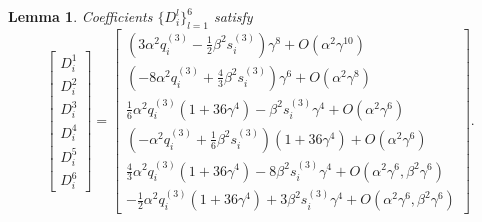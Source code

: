 \documentclass[11pt,letterpaper]{amsart}
\newtheorem{lemma}[theorem]{Lemma}
\theoremstyle{definition}
\theoremstyle{remark}
\numberwithin{equation}{section}
\begin{document}
\begin{lemma}\label{corfficient-h}
    Coefficients $\{D^l_i\}_{l=1}^6$ satisfy
    \begin{equation*}
    \begin{bmatrix}
        D^1_i\\
        D^2_i\\
        D^3_i\\
        D^4_i\\
        D^5_i\\
        D^6_i
    \end{bmatrix}=\begin{bmatrix}
        \left(3\alpha^2q^{(3)}_i-\frac{1}{2}\beta^2 s^{(3)}_i\right)\gamma^8+O(\alpha^2\gamma^{10})\\
       \left(-8\alpha^2q^{(3)}_i+\frac{4}{3}\beta^2 s^{(3)}_i\right)\gamma^6+O(\alpha^2\gamma^{8})\\
        \frac{1}{6}\alpha^2 q^{(3)}_i\left(1+36\gamma^4\right)-\beta^2 s^{(3)}_i\gamma^4+O(\alpha^2\gamma^6 )\\
        \left(-\alpha^2 q^{(3)}_i+\frac{1}{6}\beta^2 s^{(3)}_i\right)\left(1+36\gamma^4\right)+O(\alpha^2\gamma^6 )\\
        \frac{4}{3}\alpha^2 q^{(3)}_i\left(1+36\gamma^4\right)-8\beta^2 s^{(3)}_i\gamma^4+O(\alpha^2\gamma^6,\beta^2\gamma^6 )\\
       -\frac{1}{2}\alpha^2 q^{(3)}_i\left(1+36\gamma^4\right)+3\beta^2 s^{(3)}_i\gamma^4+O(\alpha^2\gamma^6,\beta^2\gamma^6 )
    \end{bmatrix}.
\end{equation*}
\end{lemma}
\end{document}
